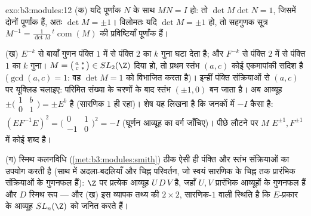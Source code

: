 \begin{solution}{exo:b3:modules:12}
(क) यदि पूर्णांक $N$ के साथ $MN = I$ हो: तो $\det M\det N = 1$, जिसमें दोनों
पूर्णांक हैं, अतः $\det M = \pm1$। विलोमतः यदि $\det M =
\pm1$ हो, तो सहगुणक सूत्र $M^{-1} =
\frac1{\det M}\,{}^t\!\operatorname{com}(M)$
की प्रविष्टियाँ पूर्णांक हैं।

(ख) $E^{-k}$ से बायाँ गुणन पंक्ति $1$ में से पंक्ति $2$ का $k$
गुना घटा देता है; और $F^{-k}$ से पंक्ति $2$ में से पंक्ति $1$ का
$k$ गुना। $M = \bigl(\begin{smallmatrix}a & *\\ c &
*\end{smallmatrix}\bigr) \in SL_2(\Z)$ दिया हो, तो प्रथम स्तंभ $(a, c)$ कोई एकमापांकी सदिश
है ($\gcd(a, c) = 1$: वह $\det M = 1$ को विभाजित करता है)। इन्हीं पंक्ति संक्रियाओं
से $(a, c)$ पर यूक्लिड चलाइए: परिमित संख्या के चरणों के बाद स्तंभ $(\pm1, 0)$
बन जाता है। अब आव्यूह $\pm
\bigl(\begin{smallmatrix}1 & b\\ 0 & 1\end{smallmatrix}
\bigr) = \pm E^{b}$ है (सारणिक $1$ ही रहा)। शेष यह लिखना
है कि जनकों में $-I$ कैसा है: $(EF^{-1}E)^2 =
\bigl(\begin{smallmatrix}0 & 1\\ -1 &
0\end{smallmatrix}\bigr)^2 = -I$ (घूर्णन आव्यूह का वर्ग जाँचिए)।
पीछे लौटने पर $M$ $E^{\pm1},
F^{\pm1}$ में कोई शब्द है।

(ग) स्मिथ कलनविधि (\cref{met:b3:modules:smith}) ठीक ऐसी ही पंक्ति और स्तंभ संक्रियाओं का
उपयोग करती है (साथ में अदला-बदलियाँ और चिह्न परिवर्तन, जो स्वयं
सारणिक के चिह्न तक प्रारंभिक संक्रियाओं के गुणनफल हैं): $\Z$ पर
प्रत्येक आव्यूह $U\,D\,V$ है, जहाँ $U, V$ प्रारंभिक आव्यूहों के गुणनफल
हैं और $D$ स्मिथ रूप --- और (ख) इस व्यापक तथ्य की $2\times2$,
सारणिक-$1$ वाली स्थिति है कि $E$-प्रकार के आव्यूह $SL_n(\Z)$ को जनित
करते हैं।
\end{solution}

